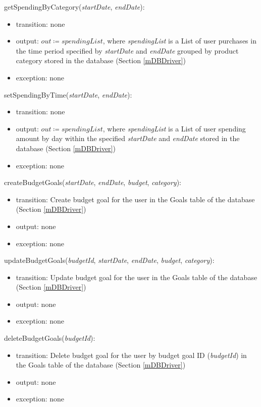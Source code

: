 \documentclass[12pt, titlepage]{article}
\begin{document}
\noindent getSpendingByCategory(\textit{startDate}, \textit{endDate}):
\begin{itemize}
\item transition: none
\item output: \( \textit{out} \coloneqq spendingList \), where \textit{spendingList} is a List of user purchases in the time period specified by \textit{startDate} and \textit{endDate} grouped by product category stored in the database (Section \ref{mDBDriver})
\item exception: none
\end{itemize}

\noindent setSpendingByTime(\textit{startDate}, \textit{endDate}):
\begin{itemize}
\item transition: none
\item output: \( \textit{out} \coloneqq spendingList \), where \textit{spendingList} is a List of user spending amount by day within the specified \textit{startDate} and \textit{endDate} stored in the database (Section \ref{mDBDriver})
\item exception: none
\end{itemize}

\noindent createBudgetGoals(\textit{startDate}, \textit{endDate}, \textit{budget}, \textit{category}):
\begin{itemize}
\item transition: Create budget goal for the user in the Goals table of the database (Section \ref{mDBDriver})
\item output: none
\item exception: none
\end{itemize}

\noindent updateBudgetGoals(\textit{budgetId}, \textit{startDate}, \textit{endDate}, \textit{budget}, \textit{category}):
\begin{itemize}
\item transition: Update budget goal for the user in the Goals table of the database (Section \ref{mDBDriver})
\item output: none
\item exception: none
\end{itemize}

\noindent deleteBudgetGoals(\textit{budgetId}):
\begin{itemize}
\item transition: Delete budget goal for the user by budget goal ID (\textit{budgetId}) in the Goals table of the database (Section \ref{mDBDriver})
\item output: none
\item exception: none
\end{itemize}
\end{document}
